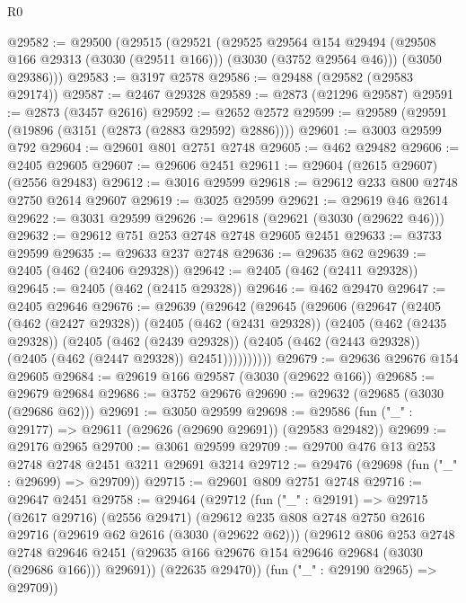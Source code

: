 \begin{lexlean}{R0}
\begin{coremodule}
@29582 := @29500
    (@29515
      (@29521
        (@29525
          @29564
          @154
          @29494
          (@29508 @166 @29313 (@3030 (@29511 @166)))
          (@3030 (@3752 @29564 @46)))
        (@3050 @29386)))
@29583 := @3197 @2578
@29586 := @29488 (@29582 (@29583 @29174))
@29587 := @2467 @29328
@29589 := @2873 (@21296 @29587)
@29591 := @2873 (@3457 @2616)
@29592 := @2652 @2572
@29599 := @29589 (@29591 (@19896 (@3151 (@2873 (@2883 @29592) @2886))))
@29601 := @3003 @29599 @792
@29604 := @29601 @801 @2751 @2748
@29605 := @462 @29482
@29606 := @2405 @29605
@29607 := @29606 @2451
@29611 := @29604 (@2615 @29607) (@2556 @29483)
@29612 := @3016 @29599
@29618 := @29612 @233 @800 @2748 @2750 @2614 @29607
@29619 := @3025 @29599
@29621 := @29619 @46 @2614
@29622 := @3031 @29599
@29626 := @29618 (@29621 (@3030 (@29622 @46)))
@29632 := @29612 @751 @253 @2748 @2748 @29605 @2451
@29633 := @3733 @29599
@29635 := @29633 @237 @2748
@29636 := @29635 @62
@29639 := @2405 (@462 (@2406 @29328))
@29642 := @2405 (@462 (@2411 @29328))
@29645 := @2405 (@462 (@2415 @29328))
@29646 := @462 @29470
@29647 := @2405 @29646
@29676 := @29639
    (@29642
      (@29645
        (@29606
          (@29647
            (@2405
              (@462 (@2427 @29328))
              (@2405
                (@462 (@2431 @29328))
                (@2405
                  (@462 (@2435 @29328))
                  (@2405
                    (@462 (@2439 @29328))
                    (@2405 (@462 (@2443 @29328)) (@2405 (@462 (@2447 @29328)) @2451))))))))))
@29679 := @29636 @29676 @154 @29605
@29684 := @29619 @166 @29587 (@3030 (@29622 @166))
@29685 := @29679 @29684
@29686 := @3752 @29676
@29690 := @29632 (@29685 (@3030 (@29686 @62)))
@29691 := @3050 @29599
@29698 := @29586 (fun ("_" : @29177) => @29611 (@29626 (@29690 @29691)) (@29583 @29482))
@29699 := @29176 @2965
@29700 := @3061 @29599
@29709 := @29700 @476 @13 @253 @2748 @2748 @2451 @3211 @29691 @3214
@29712 := @29476 (@29698 (fun ("_" : @29699) => @29709))
@29715 := @29601 @809 @2751 @2748
@29716 := @29647 @2451
@29758 := @29464
    (@29712
      (fun ("_" : @29191) =>
      @29715
        (@2617 @29716)
        (@2556 @29471)
        (@29612
          @235
          @808
          @2748
          @2750
          @2616
          @29716
          (@29619 @62 @2616 (@3030 (@29622 @62)))
          (@29612
            @806
            @253
            @2748
            @2748
            @29646
            @2451
            (@29635 @166 @29676 @154 @29646 @29684 (@3030 (@29686 @166)))
            @29691))
        (@22635 @29470))
      (fun ("_" : @29190 @2965) => @29709))

\end{coremodule}
\end{lexlean}
